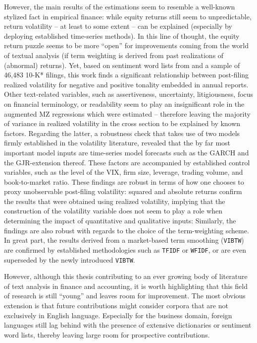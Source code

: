 However, the main results of the estimations seem to resemble a well-known stylized fact in empirical finance: while equity returns still seem to unpredictable, return volatility -- at least to some extent -- can be explained (especially by deploying established time-series methods). In this line of thought, the equity return puzzle seems to be more \enquote{open} for improvements coming from the world of textual analysis (if term weighting is derived from past realizations of (abnormal) returns). Yet, based on sentiment word lists from \textcite{Loughran2011, Loughran2014} and a sample of 46,483 10-K* filings, this work finds a significant relationship between post-filing realized volatility for negative and positive tonality embedded in annual reports. Other text-related variables, such as assertiveness, uncertainty, litigiousness, focus on financial terminology, or readability seem to play an insignificant role in the augmented MZ regressions which were estimated -- therefore leaving the majority of variance in realized volatility in the cross section to be explained by known factors. Regarding the latter, a robustness check that takes use of two models firmly established in the volatility literature, revealed that the by far most important model inputs are time-series model forecasts such as the GARCH and the GJR-extension thereof. These factors are accompanied by established control variables, such as the level of the VIX, firm size, leverage, trading volume, and book-to-market ratio. These findings are robust in terms of how one chooses to proxy unobservable post-filing volatility: squared and absolute returns confirm the results that were obtained using realized volatility, implying that the construction of the volatility variable does not seem to play a role when determining the impact of quantitative and qualitative inputs: Similarly, the findings are also robust with regards to the choice of the term-weighting scheme. In great part, the results derived from a market-based term smoothing (\texttt{VIBTW}) are confirmed by established methodologies such as \texttt{TFIDF} or \texttt{WFIDF}, or are even superseded by the newly introduced \texttt{VIBTW}. 

However, although this thesis contributing to an ever growing body of literature of text analysis in finance and accounting, it is worth highlighting that this field of research is still \enquote{young} and leaves room for improvement. The most obvious extension is that future contributions might consider corpora that are not exclusively in English language. Especially for the business domain, foreign languages still lag behind with the presence of extensive dictionaries or sentiment word lists, thereby leaving large room for prospective contributions. 

